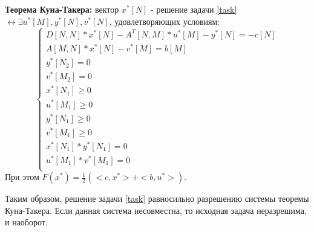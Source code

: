 \documentclass[12pt,a4paper]{article}
\begin{document}
\textbf{Теорема Куна-Такера:} вектор $x^*[N]$ - решение задачи \eqref{task} $\leftrightarrow \exists u^*[M],y^*[N],v^*[N]$, удовлетворяющих условиям:
\begin{equation}
    \left\{
    \begin{array}{ll}
        D[N,N]*x^*[N]-A^T[N,M]*u^*[M]-y^*[N]=-c[N]\\
        A[M,N]*x^*[N]-v^*[M]=b[M]\\
        y^*[N_2]=0\\
        v^*[M_2]=0\\
        x^*[N_1]\geq0\\
        u^*[M_1]\geq0\\
        y^*[N_1]\geq0\\
        v^*[M_1]\geq0\\
        x^*[N_1]*y^*[N_1]=0\\
        u^*[M_1]*v^*[M_1]=0\\
    \end{array}
    \right.
\end{equation}
При этом $F(x^*)=\frac{1}{2}(<c,x^*>+<b,u^*>)$.

Таким образом, решение задачи \eqref{task} равносильно разрешению системы теоремы Куна-Такера. Если данная система несовместна, то исходная задача неразрешима, и наоборот.
\end{document}

